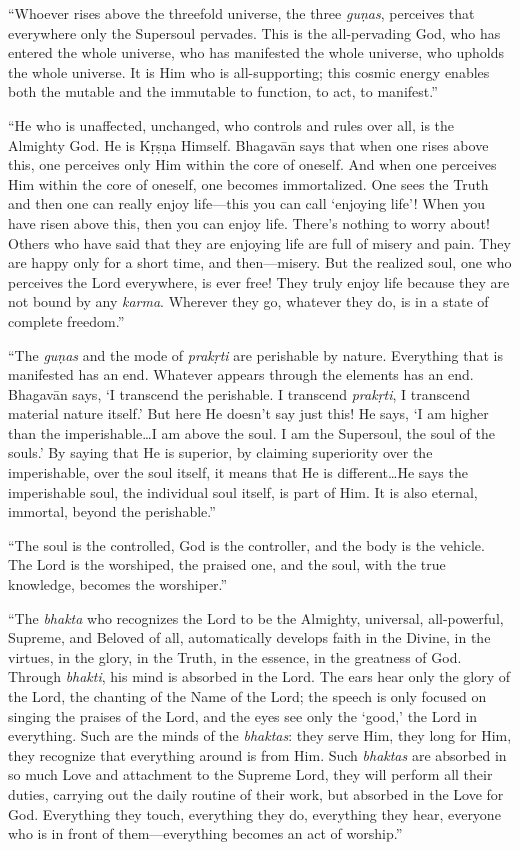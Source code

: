 \documentclass[12pt, twoside, openright]{memoir}
\begin{document}
\enquote{Whoever rises above the threefold universe, the three \textit{guṇas}, perceives that everywhere only the Supersoul pervades. This is the all-pervading God, who has entered the whole universe, who has manifested the whole universe, who upholds the whole universe. It is Him who is all-supporting; this cosmic energy enables both the mutable and the immutable to function, to act, to manifest.}

\enquote{He who is unaffected, unchanged, who controls and rules over all, is the Almighty God. He is Kṛṣṇa Himself. Bhagavān says that when one rises above this, one perceives only Him within the core of oneself. And when one perceives Him within the core of oneself, one becomes immortalized. One sees the Truth and then one can really enjoy life---this you can call \enquote{enjoying life}! When you have risen above this, then you can enjoy life. There’s nothing to worry about! Others who have said that they are enjoying life are full of misery and pain. They are happy only for a short time, and then---misery. But the realized soul, one who perceives the Lord everywhere, is ever free! They truly enjoy life because they are not bound by any \textit{karma}. Wherever they go, whatever they do, is in a state of complete freedom.}

\enquote{The \textit{guṇas} and the mode of \textit{prakṛti} are perishable by nature. Everything that is manifested has an end. Whatever appears through the elements has an end. Bhagavān says, \enquote{I transcend the perishable. I transcend \textit{prakṛti}, I transcend material nature itself.} But here He doesn’t say just this! He says, \enquote{I am higher than the imperishable\ldots I am above the soul. I am the Supersoul, the soul of the souls.} By saying that He is superior, by claiming superiority over the imperishable, over the soul itself, it means that He is different\ldots He says the imperishable soul, the individual soul itself, is part of Him. It is also eternal, immortal, beyond the perishable.}

\enquote{The soul is the controlled, God is the controller, and the body is the vehicle. The Lord is the worshiped, the praised one, and the soul, with the true knowledge, becomes the worshiper.}

\enquote{The \textit{bhakta} who recognizes the Lord to be the Almighty, universal, all-powerful, Supreme, and Beloved of all, automatically develops faith in the Divine, in the virtues, in the glory, in the Truth, in the essence, in the greatness of God. Through \textit{bhakti}, his mind is absorbed in the Lord. The ears hear only the glory of the Lord, the chanting of the Name of the Lord; the speech is only focused on singing the praises of the Lord, and the eyes see only the \enquote{good,} the Lord in everything. Such are the minds of the \textit{bhaktas}: they serve Him, they long for Him, they recognize that everything around is from Him. Such \textit{bhaktas} are absorbed in so much Love and attachment to the Supreme Lord, they will perform all their duties, carrying out the daily routine of their work, but absorbed in the Love for God. Everything they touch, everything they do, everything they hear, everyone who is in front of them---everything becomes an act of worship.}
\end{document}
